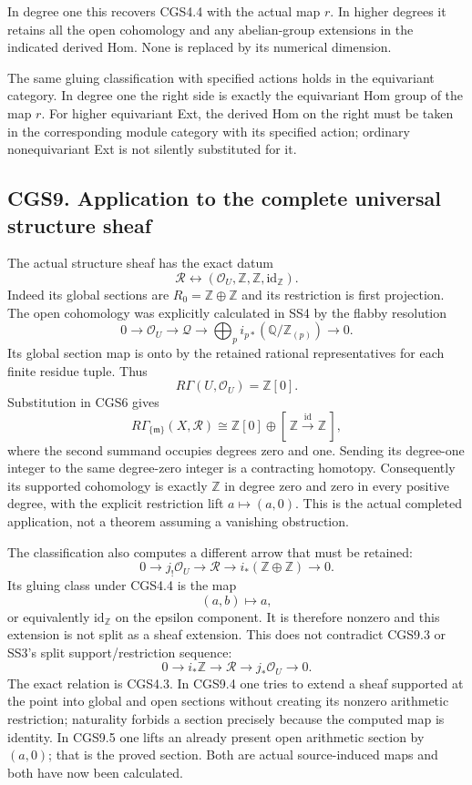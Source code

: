 In degree one this recovers CGS4.4 with the actual map \(r\). In higher
degrees it retains all the open cohomology and any abelian-group
extensions in the indicated derived Hom. None is replaced by its
numerical dimension.

The same gluing classification with specified actions holds in the
equivariant category. In degree one the right side is exactly the
equivariant Hom group of the map \(r\). For higher equivariant Ext, the
derived Hom on the right must be taken in the corresponding module
category with its specified action; ordinary nonequivariant Ext is not
silently substituted for it.

\subsection{CGS9. Application to the complete universal structure
sheaf}\label{cgs9.-application-to-the-complete-universal-structure-sheaf}

The actual structure sheaf has the exact datum \[
 \mathcal R
 \longleftrightarrow
 (\mathcal O_U,\mathbb Z,\mathbb Z,\mathrm{id}_{\mathbb Z}).
\tag{CGS9.1}
\] Indeed its global sections are \(R_0=\mathbb Z\oplus\mathbb Z\) and
its restriction is first projection. The open cohomology was explicitly
calculated in SS4 by the flabby resolution \[
 0\to\mathcal O_U\to\mathcal Q
 \to\bigoplus_p i_{p*}(\mathbb Q/\mathbb Z_{(p)})\to0.
\] Its global section map is onto by the retained rational
representatives for each finite residue tuple. Thus \[
 R\Gamma(U,\mathcal O_U)=\mathbb Z[0].
\tag{CGS9.2}
\] Substitution in CGS6 gives \[
 R\Gamma_{\{\mathfrak m\}}(X,\mathcal R)
 \cong\mathbb Z[0]\oplus
 [\,\mathbb Z\xrightarrow{\mathrm{id}}\mathbb Z\,],
\tag{CGS9.3}
\] where the second summand occupies degrees zero and one. Sending its
degree-one integer to the same degree-zero integer is a contracting
homotopy. Consequently its supported cohomology is exactly \(\mathbb Z\)
in degree zero and zero in every positive degree, with the explicit
restriction lift \(a\mapsto(a,0)\). This is the actual completed
application, not a theorem assuming a vanishing obstruction.

The classification also computes a different arrow that must be
retained: \[
 0\to j_!\mathcal O_U\to\mathcal R
 \to i_*(\mathbb Z\oplus\mathbb Z)\to0.
\tag{CGS9.4}
\] Its gluing class under CGS4.4 is the map \[
 (a,b)\longmapsto a,
\] or equivalently \(\mathrm{id}_{\mathbb Z}\) on the epsilon component.
It is therefore nonzero and this extension is not split as a sheaf
extension. This does not contradict CGS9.3 or SS3's split
support/restriction sequence: \[
 0\to i_*\mathbb Z\to\mathcal R
 \to j_*\mathcal O_U\to0.
\tag{CGS9.5}
\] The exact relation is CGS4.3. In CGS9.4 one tries to extend a sheaf
supported at the point into global and open sections without creating
its nonzero arithmetic restriction; naturality forbids a section
precisely because the computed map is identity. In CGS9.5 one lifts an
already present open arithmetic section by \((a,0)\); that is the proved
section. Both are actual source-induced maps and both have now been
calculated.

